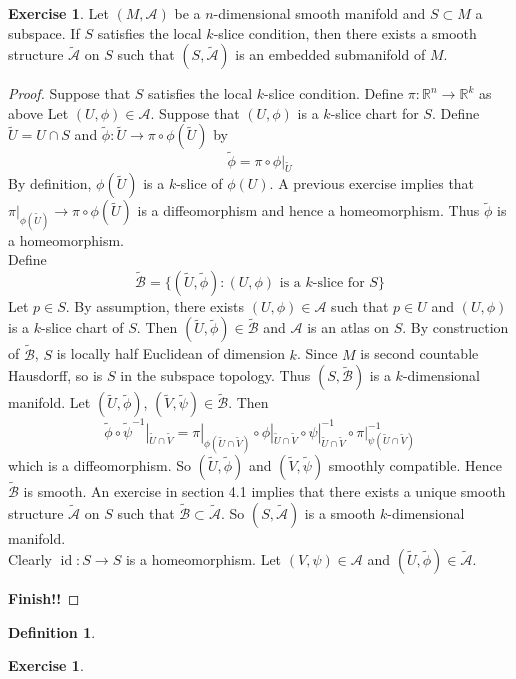 \documentclass[12pt]{amsart}
\theoremstyle{definition}
\newtheorem{defn}[definition]{Definition}
\newtheorem{ex}[definition]{Exercise}
\newcommand{\R}{\mathbb{R}}
\newcommand{\MA}{\mathcal{A}}
\newcommand{\MB}{\mathcal{B}}
\newcommand{\tMA}{\tilde{\MA}}
\newcommand{\tMB}{\tilde{\MB}}
\newcommand{\tU}{\tilde{U}}
\newcommand{\tV}{\tilde{V}}
\newcommand{\tphi}{\tilde{\phi}}
\newcommand{\tpsi}{\tilde{\psi}}
\DeclareMathOperator{\id}{id}
\begin{document}
	\begin{ex}
	Let $(M, \MA)$ be a $n$-dimensional smooth manifold and $S \subset M$ a subspace. If $S$ satisfies the local $k$-slice condition, then there exists a smooth structure $\tMA$ on $S$ such that $(S, \tMA)$ is an embedded submanifold of $M$.
	\end{ex}	
	
	\begin{proof}
	Suppose that $S$ satisfies the local $k$-slice condition. Define $\pi: \R^n \rightarrow \R^k$ as above Let $(U, \phi) \in \MA$. Suppose that $(U, \phi)$ is a $k$-slice chart for $S$. Define $\tU = U \cap S$ and $\tphi: \tU \rightarrow \pi \circ \phi(\tU)$ by $$\tphi = \pi \circ \phi|_{\tU}$$ By definition, $\phi(\tU)$ is a $k$-slice of $\phi(U)$. A previous exercise implies that $\pi|_{\phi(\tU)} \rightarrow \pi \circ \phi(\tU)$ is a diffeomorphism and hence a homeomorphism. Thus $\tphi$ is a homeomorphism.\\
	Define $$\tMB = \{(\tU, \tphi): (U, \phi) \text{ is a $k$-slice for $S$} \}$$
	Let $p \in S$. By assumption, there exists $(U, \phi) \in \MA$ such that $p \in U$ and $(U, \phi)$ is a $k$-slice chart of $S$. Then $(\tU, \tphi) \in \tMB$ and $\MA$ is an atlas on $S$. By construction of $\tMB$, $S$ is locally half Euclidean of dimension $k$.  Since $M$ is second countable Hausdorff, so is $S$ in the subspace topology. Thus $(S, \tMB)$ is a $k$-dimensional manifold.
	Let $(\tU, \tphi)$, $(\tV, \tpsi) \in \tMB$. Then
	$$\tphi \circ \tpsi^{-1}|_{\tU \cap \tV} = \pi|_{\phi(\tU \cap \tV)} \circ \phi|_{\tU \cap \tV} \circ \psi|_{\tU \cap \tV}^{-1} \circ \pi|_{\psi(\tU \cap \tV)}^{-1} $$
	which is a diffeomorphism. So $(\tU, \tphi)$ and $(\tV, \tpsi)$ smoothly compatible. Hence $\tMB$ is smooth. An exercise in section 4.1 implies that there exists a unique smooth structure $\tMA$ on $S$ such that $\tMB \subset \tMA$. So $(S, \tMA)$ is a smooth $k$-dimensional manifold.\\
	Clearly $\id: S \rightarrow S$ is a homeomorphism. Let $(V, \psi) \in \MA$ and $(\tU, \tphi) \in \tMA$. 
	
	\textbf{Finish!!}
	\end{proof}
	
	
	
	
	\begin{defn}
	
	\end{defn}	
	
	\begin{ex}
	
	\end{ex}	
	
\end{document}
